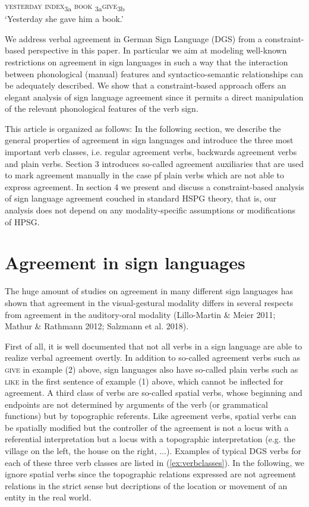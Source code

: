 \documentclass[11pt,a4paper,fleqn]{article}
\begin{document}
\begin{exe}
	\ex \label{ex:poss}
	\textsc{yesterday} \textsc{index}\textsubscript{3a} \textsc{book} \textsubscript{3a}\textsc{give}\textsubscript{3b}\\
	‘Yesterday she gave him a book.’
\end{exe}

We address verbal agreement in German Sign Language (DGS) from a constraint-based perspective in this paper. In particular we aim at modeling well-known restrictions on agreement in sign languages in such a way that the interaction between phonological (manual) features and syntactico-semantic relationships can be adequately described. We show that a constraint-based approach offers an elegant analysis of sign language agreement since it permits a direct manipulation of the relevant phonological features of the verb sign. 

This article is organized as follows: In the following section, we describe the general properties of agreement in sign languages and introduce the three most important verb classes, i.e. regular agreement verbs, backwards agreement verbs and plain verbs. Section 3 introduces so-called agreement auxiliaries that are used to mark agreement manually in the case pf plain verbs which are not able to express agreement. In section 4 we present and discuss a constraint-based analysis of sign language agreement couched in standard HSPG theory, that is, our analysis does not depend on any modality-specific assumptions or modifications of HPSG.


\section{Agreement in sign languages}

The huge amount of studies on agreement in many different sign languages has shown that agreement in the visual-gestural modality differs in several respects from agreement in the auditory-oral modality (Lillo-Martin \& Meier 2011; Mathur \& Rathmann 2012; Salzmann et al. 2018). 

First of all, it is well documented that not all verbs in a sign language are able to realize verbal agreement overtly. In addition to so-called agreement verbs such as \textsc{give} in example (2) above, sign languages also have so-called plain verbs such as \textsc{like} in the first sentence of example (1) above, which cannot be inflected for agreement. A third class of verbs are so-called spatial verbs, whose beginning and endpoints are not determined by arguments of the verb (or grammatical functions) but by topographic referents. Like agreement verbs, spatial verbs can be spatially modified but the controller of the agreement is not a locus with a referential interpretation but a locus with a topographic interpretation (e.g. the village on the left, the house on the right, $\ldots$). Examples of typical DGS verbs for each of these three verb classes are listed in (\ref{ex:verbclasses}). In the following, we ignore spatial verbs since the topographic relations expressed are not agreement relations in the strict sense but decriptions of the location or movement of an entity in the real world. 
\end{document}

